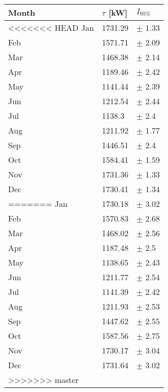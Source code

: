 \begin{tabular}{lll}
\toprule
Month & $\tau$ [kW] &   $I_{95\%}$ \\
\midrule
<<<<<<< HEAD
  Jan &     1731.29 &   $\pm$ 1.33 \\
  Feb &     1571.71 &   $\pm$ 2.09 \\
  Mar &     1468.38 &   $\pm$ 2.14 \\
  Apr &     1189.46 &   $\pm$ 2.42 \\
  May &     1141.44 &   $\pm$ 2.39 \\
  Jun &     1212.54 &   $\pm$ 2.44 \\
  Jul &      1138.3 &    $\pm$ 2.4 \\
  Aug &     1211.92 &   $\pm$ 1.77 \\
  Sep &     1446.51 &    $\pm$ 2.4 \\
  Oct &     1584.41 &   $\pm$ 1.59 \\
  Nov &     1731.36 &   $\pm$ 1.33 \\
  Dec &     1730.41 &   $\pm$ 1.34 \\
=======
  Jan &     1730.18 &   $\pm$ 3.02 \\
  Feb &     1570.83 &   $\pm$ 2.68 \\
  Mar &     1468.02 &   $\pm$ 2.56 \\
  Apr &     1187.48 &    $\pm$ 2.5 \\
  May &     1138.65 &   $\pm$ 2.43 \\
  Jun &     1211.77 &   $\pm$ 2.54 \\
  Jul &     1141.39 &   $\pm$ 2.42 \\
  Aug &     1211.93 &   $\pm$ 2.53 \\
  Sep &     1447.62 &   $\pm$ 2.55 \\
  Oct &     1587.56 &   $\pm$ 2.75 \\
  Nov &     1730.17 &   $\pm$ 3.04 \\
  Dec &     1731.64 &   $\pm$ 3.02 \\
>>>>>>> master
\bottomrule
\end{tabular}
